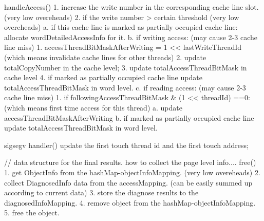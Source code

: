         handleAccess(){
            1. increase the write number in the corresponding cache line slot.  (very low overeheads)
            2. if the write number > certain threshold                          (very low overeheads)
                      a. if this cache line is marked as partially occupied cache line:
                            allocate wordDetailedAccessInfo for it.
                      b. if writing access:                  (may cause 2-3 cache line miss)
                            1. accessThreadBitMaskAfterWriting = 1 << lastWriteThreadId (which means invalidate cache lines for other threads)
                            2. update totalCopyNumber in the cache level;
                            3. update totalAccessThreadBitMask in cache level
                            4. if marked as partially occupied cache line
                                    update totalAccessThreadBitMask in word level.
                      c. if reading access:                   (may cause 2-3 cache line miss)
                            1. if followingAccessThreadBitMask & (1 << threadId) ==0: (which means first time access for this thread)
                                    a. update accessThreadBitMaskAfterWriting
                                    b. if marked as partially occupied cache line
                                            update totalAccessThreadBitMask in word level.
        }


        sigsegv handler() {
            update the first touch thread id and the first touch address;
        }

        // data structure for the final results. how to collect the page level info....
        free() {
            1. get ObjectInfo from the hashMap-objectInfoMapping. (very low overeheads)
            2. collect DiagnosedInfo data from the accessMapping. (can be easily summed up according to current data)
            3. store the diagnose results to the diagnosedInfoMapping.
            4. remove object from the hashMap-objectInfoMapping.
            5. free the object.
        }
